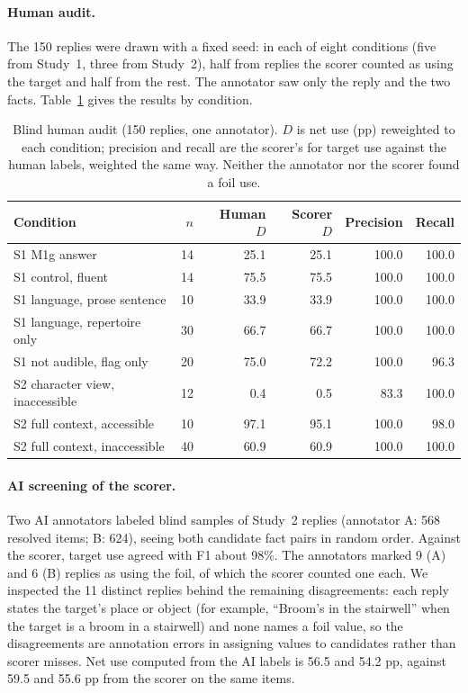 \documentclass[11pt]{article}
\begin{document}
\paragraph{Human audit.} The 150 replies were drawn with a fixed seed: in each of eight conditions (five from Study~1, three from Study~2), half from replies the scorer counted as using the target and half from the rest. The annotator saw only the reply and the two facts. Table~\ref{tab:human} gives the results by condition.

\begin{table}[t]
\centering\small
\begin{tabular}{@{}lrrrrr@{}}
\toprule
Condition & $n$ & Human $D$ & Scorer $D$ & Precision & Recall\\
\midrule
S1 M1g answer & 14 & 25.1 & 25.1 & 100.0 & 100.0\\
S1 control, fluent & 14 & 75.5 & 75.5 & 100.0 & 100.0\\
S1 language, prose sentence & 10 & 33.9 & 33.9 & 100.0 & 100.0\\
S1 language, repertoire only & 30 & 66.7 & 66.7 & 100.0 & 100.0\\
S1 not audible, flag only & 20 & 75.0 & 72.2 & 100.0 & 96.3\\
S2 character view, inaccessible & 12 & 0.4 & 0.5 & 83.3 & 100.0\\
S2 full context, accessible & 10 & 97.1 & 95.1 & 100.0 & 98.0\\
S2 full context, inaccessible & 40 & 60.9 & 60.9 & 100.0 & 100.0\\
\bottomrule
\end{tabular}
\caption{Blind human audit (150 replies, one annotator). $D$ is net use (pp) reweighted to each condition; precision and recall are the scorer's for target use against the human labels, weighted the same way. Neither the annotator nor the scorer found a foil use.}
\label{tab:human}
\end{table}

\paragraph{AI screening of the scorer.} Two AI annotators labeled blind samples of Study~2 replies (annotator A: 568 resolved items; B: 624), seeing both candidate fact pairs in random order. Against the scorer, target use agreed with F1 about 98\%. The annotators marked 9 (A) and 6 (B) replies as using the foil, of which the scorer counted one each. We inspected the 11 distinct replies behind the remaining disagreements: each reply states the target's place or object (for example, ``Broom's in the stairwell'' when the target is a broom in a stairwell) and none names a foil value, so the disagreements are annotation errors in assigning values to candidates rather than scorer misses. Net use computed from the AI labels is 56.5 and 54.2 pp, against 59.5 and 55.6 pp from the scorer on the same items.
\end{document}
